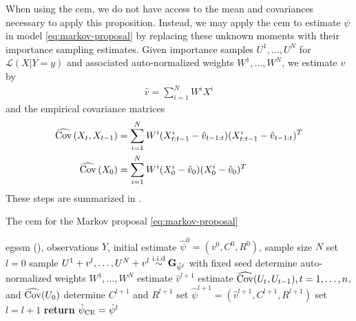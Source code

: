 When using the \acrshort{cem}, we do not have access to the mean and covariances necessary to apply this proposition. Instead, we may apply the \gls{cem} to estimate $\psi$ in model \eqref{eq:markov-proposal} by replacing these unknown moments with their importance sampling estimates. Given importance samples $U^{1}, \dots, U^{N}$ for $\mathcal L (X| Y = y)$ and associated auto-normalized weights $W^{1}, \dots, W^{N}$, we estimate $v$ by 
\begin{align}
\label{eq:hat_v}
\hat v = \sum_{i = 1}^N W^{i}X^{i}
\end{align}
and the empirical covariance matrices
\begin{align}
    \label{eq:empirical_covs}
    \begin{split}
    \widehat{\operatorname{Cov}} \left( X_{t}, X_{t - 1} \right) &= \sum_{i = 1}^N W^{i}(X_{t:t-1}^{i} - \hat v_{t-1:t}) (X_{t:t-1}^{i} - \hat v_{t-1:t})^{T}\\
\widehat{\operatorname{Cov}} \left( X_{0}\right) &= \sum_{i = 1}^N W^{i}(X_{0}^{i} - \hat v_{0}) (X_{0}^{i} - \hat v_{0})^{T}
    \end{split}
\end{align}
These steps are summarized in . 

\begin{algorithm}
    \caption{The \gls{cem} for the Markov proposal \eqref{eq:markov-proposal}}
    \label{alg:cem-markov-proposal}
    \begin{algorithmic}[1]
        \Require \gls{egssm} (), observations $Y$, initial estimate $\hat\psi^0 = \left( v^{0}, C^{0}, R^{0}\right)$, sample size $N$
        \State set $l = 0$
        \Repeat 
            \State\label{step:cem-simulate} sample $U^{1} + v^{l}, \dots, U^{N} + v^{l} \stackrel{\text{i.i.d}}{\sim} \mathbf G_{\hat\psi^{l}}$ with fixed seed  
            \State\label{step:cem-weights} determine auto-normalized weights $W^{1}, \dots, W^{N}$ 
            \State\label{step:cem-est_v} estimate $\hat v^{l + 1}$  
            \State\label{step:cem-est_cov} estimate $\widehat{\operatorname{Cov}} (U_{t}, U_{t-1}), t=1, \dots, n$, and $\widehat{\operatorname{Cov}} (U_{0})$ 
            \State\label{step:cem-C_R} determine $C^{l + 1}$ and $R^{l + 1}$ 
            \State\label{step:cem-est_phi} set $\hat\psi^{l + 1} = \left( \hat v^{l + 1}, C^{l + 1}, R^{l + 1}\right)$ 
            \State set $l = l + 1$
        \State \textbf{return} ${\hat\psi_{\text{CE}}} = \hat \psi^{l}$
    \end{algorithmic}
\end{algorithm}

